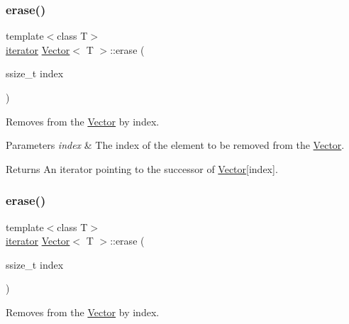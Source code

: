 \subsubsection{\texorpdfstring{erase()}{erase()}\hspace{0.1cm}{\footnotesize\ttfamily [5/6]}}
{\footnotesize\ttfamily template$<$class T$>$ \\
\hyperlink{classVector_a45531016f99e90887e0f890f2da943e4}{iterator} \hyperlink{classVector}{Vector}$<$ T $>$\+::erase (\begin{DoxyParamCaption}\item[{ssize\+\_\+t}]{index }\end{DoxyParamCaption})\hspace{0.3cm}{\ttfamily [inline]}}



Removes from the \hyperlink{classVector}{Vector} by index. 


\begin{DoxyParams}{Parameters}
{\em index} & The index of the element to be removed from the \hyperlink{classVector}{Vector}. \\
\hline
\end{DoxyParams}
\begin{DoxyReturn}{Returns}
An iterator pointing to the successor of \hyperlink{classVector}{Vector}\mbox{[}index\mbox{]}. 
\end{DoxyReturn}
\mbox{\label{classVector_ab1947437ba829a39c6fd20ada89ec892}} 
\subsubsection{\texorpdfstring{erase()}{erase()}\hspace{0.1cm}{\footnotesize\ttfamily [6/6]}}
{\footnotesize\ttfamily template$<$class T$>$ \\
\hyperlink{classVector_a45531016f99e90887e0f890f2da943e4}{iterator} \hyperlink{classVector}{Vector}$<$ T $>$\+::erase (\begin{DoxyParamCaption}\item[{ssize\+\_\+t}]{index }\end{DoxyParamCaption})\hspace{0.3cm}{\ttfamily [inline]}}



Removes from the \hyperlink{classVector}{Vector} by index. 


